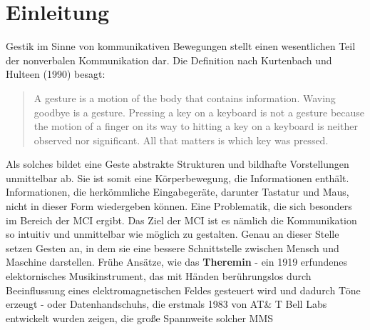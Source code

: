 \chapter{Einleitung}
\label{chap:Einleitung}
Gestik im Sinne von kommunikativen Bewegungen stellt einen wesentlichen Teil der nonverbalen Kommunikation dar. Die Definition nach Kurtenbach und Hulteen (1990) besagt:
\begin{quote}
A gesture is a motion of the body that contains information. Waving goodbye is a gesture.
Pressing a key on a keyboard is not a gesture because the motion of a finger on its way to hitting a key on a keyboard is neither observed nor significant.
All that matters is which key was pressed.
\end{quote}
Als solches bildet eine Geste abstrakte Strukturen und bildhafte Vorstellungen unmittelbar ab. Sie ist somit eine K\"orperbewegung, 
die Informationen enth\"alt. Informationen, die herk\"ommliche Eingabeger\"ate, darunter Tastatur und Maus, nicht in dieser Form wiedergeben k\"onnen.
Eine Problematik, die sich besonders im Bereich der \gls{MCI} ergibt.
Das Ziel der \gls{MCI} ist es n\"amlich die Kommunikation so intuitiv und unmittelbar wie m\"oglich zu gestalten.
Genau an dieser Stelle setzen Gesten an, in dem sie eine bessere Schnittstelle zwischen Mensch und Maschine darstellen.
\newline
Fr\"uhe Ans\"atze, wie das \textbf{Theremin} - ein 1919 erfundenes elektornisches Musikinstrument,
das mit H\"anden ber\"uhrungslos durch Beeinflussung eines elektromagnetischen Feldes gesteuert wird und dadurch T\"one erzeugt -
oder \glspl{Datenhandschuh}, die erstmals 1983 von AT\& T Bell Labs entwickelt wurden zeigen, die gro\ss e Spannweite solcher \gls{MMS}